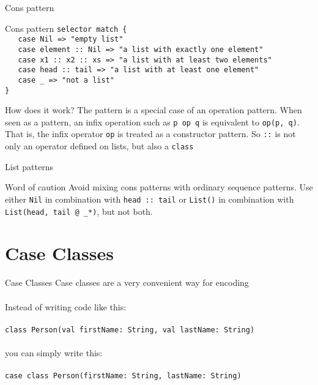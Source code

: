 \begin{frame}[fragile]{Cons pattern}
\begin{exampleblock}{Cons pattern}
\lstinline!selector match {!\\
\lstinline!   case Nil => "empty list"!\\
\lstinline!   case element :: Nil => "a list with exactly one element"!\\
\lstinline!   case x1 :: x2 :: xs => "a list with at least two elements"!\\
\lstinline!   case head :: tail => "a list with at least one element"!\\
\lstinline!   case _ => "not a list"!\\
\lstinline!}!
\end{exampleblock}
\begin{block}{How does it work?}
The  pattern is a special case of an  operation
pattern. When seen as a pattern, an infix operation such as \lstinline!p op q!
is equivalent to \lstinline!op(p, q)!. That is, the infix operator
\lstinline!op! is treated as a constructor pattern. So \lstinline!::! is not
only an operator defined on lists, but also a \lstinline!class!
\end{block}
\end{frame}

\begin{frame}[fragile]{List patterns}
\begin{alertblock}{Word of caution}
Avoid mixing cons patterns with ordinary sequence patterns. Use either
\lstinline!Nil! in combination with \lstinline!head :: tail! or
\lstinline!List()! in combination with \lstinline!List(head, tail @ _*)!, but
not both.
\end{alertblock}
\end{frame}

\section{Case Classes}
\begin{frame}[fragile]{Case Classes}
Case classes are a very convenient way for encoding \\
\lstinline!!\\
Instead of writing code like this:\\
\lstinline!!\\
\lstinline!class Person(val firstName: String, val lastName: String)!\\
\lstinline!!\\
you can simply write this:\\
\lstinline!!\\
\lstinline!case class Person(firstName: String, lastName: String)!
\end{frame}

